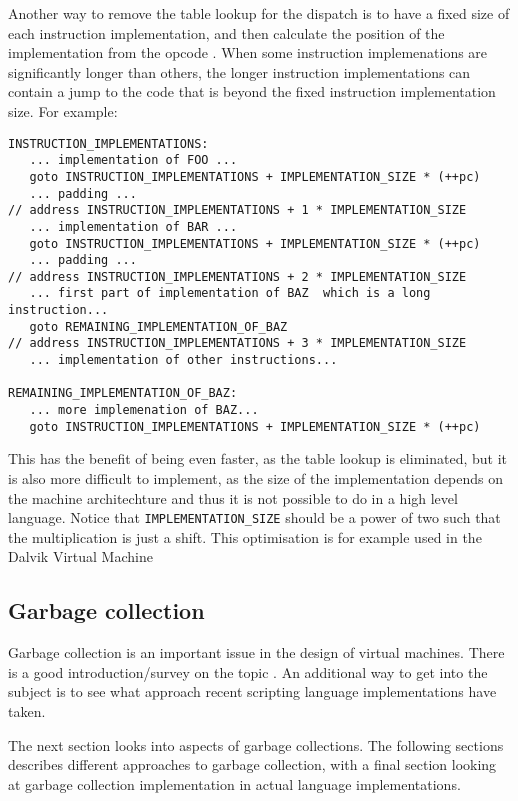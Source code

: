 \documentclass[11pt]{report}
\begin{document}
Another way to remove the table lookup for the dispatch is to have a fixed size of each instruction implementation, and then calculate the position of the implementation from the opcode \cite{dalvik-talk}. When some instruction implemenations are significantly longer than others, the longer instruction implementations can contain a jump to the code that is beyond the fixed instruction implementation size.
For example:
\begin{verbatim}
INSTRUCTION_IMPLEMENTATIONS:
   ... implementation of FOO ...
   goto INSTRUCTION_IMPLEMENTATIONS + IMPLEMENTATION_SIZE * (++pc)
   ... padding ...
// address INSTRUCTION_IMPLEMENTATIONS + 1 * IMPLEMENTATION_SIZE
   ... implementation of BAR ...
   goto INSTRUCTION_IMPLEMENTATIONS + IMPLEMENTATION_SIZE * (++pc)
   ... padding ...
// address INSTRUCTION_IMPLEMENTATIONS + 2 * IMPLEMENTATION_SIZE
   ... first part of implementation of BAZ  which is a long instruction...
   goto REMAINING_IMPLEMENTATION_OF_BAZ
// address INSTRUCTION_IMPLEMENTATIONS + 3 * IMPLEMENTATION_SIZE
   ... implementation of other instructions...

REMAINING_IMPLEMENTATION_OF_BAZ:
   ... more implemenation of BAZ...
   goto INSTRUCTION_IMPLEMENTATIONS + IMPLEMENTATION_SIZE * (++pc)
\end{verbatim}
This has the benefit of being even faster, as the table lookup is eliminated,
but it is also more difficult to implement, 
as the size of the implementation depends on the machine architechture
and thus it is not possible to do in a high level language.
Notice that \verb|IMPLEMENTATION_SIZE| should be a power of two such that the multiplication is just a shift.
This optimisation is for example used in the Dalvik Virtual Machine \cite{dalvik-vm}


\subsection{Garbage collection}
Garbage collection is an important issue in the design of virtual machines.
There is a good introduction/survey on the topic \cite{gc-survey}.
An additional way to get into the subject is to see what approach recent scripting language implementations have taken.

The next section looks into aspects of garbage collections.
The following sections describes different approaches to garbage collection,
with a final section looking at garbage collection implementation in actual language implementations.
\end{document}
